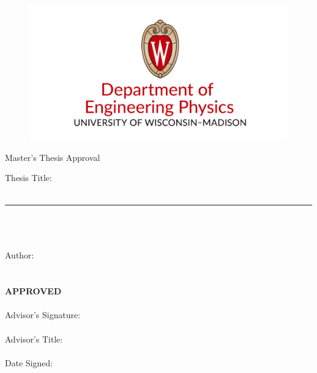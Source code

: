 \clearpage
{}

\begin{figure}[ht]
    \centering
    \includegraphics[width=5in]{./frontmatter/ep_logo.png}
\end{figure}


\begin{center}
    Master's Thesis Approval
\end{center}


Thesis Title: \hrulefill\\\\
\rule{\textwidth}{0.4pt}\\\\\\
Author: \hrulefill\\\\\\
\textbf{APPROVED}
\\
\\
Advisor's Signature: \hrulefill\\\\
  Advisor's Title: \hrulefill\\\\
  Date Signed: \hrulefill\\\\
